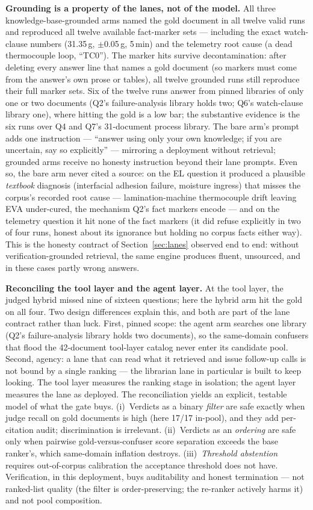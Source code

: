 \textbf{Grounding is a property of the lanes, not of the model.} All three
knowledge-base-grounded arms named the gold document in all twelve valid
runs and reproduced all twelve available fact-marker sets --- including the
exact watch-clause numbers (31.35\,g, $\pm$0.05\,g, 5\,min) and the
telemetry root cause (a dead thermocouple loop, ``TC0''). The marker hits
survive decontamination: after deleting every answer line that names a
gold document (so markers must come from the answer's own prose or
tables), all twelve grounded runs still reproduce their full marker sets.
Six of the twelve runs answer from pinned libraries of only one or two
documents (Q2's failure-analysis library holds two; Q6's watch-clause
library one), where hitting the gold is a low bar; the substantive
evidence is the six runs over Q4 and Q7's 31-document process library.
The bare arm's prompt adds one instruction --- ``answer using only your
own knowledge; if you are uncertain, say so explicitly'' --- mirroring a
deployment without retrieval; grounded arms receive no honesty
instruction beyond their lane prompts. Even so, the bare arm
never cited a source: on the EL question it produced a plausible
\emph{textbook} diagnosis (interfacial adhesion failure, moisture ingress)
that misses the corpus's recorded root cause --- lamination-machine
thermocouple drift leaving EVA under-cured, the mechanism Q2's fact
markers encode --- and on the telemetry question it hit none of the fact
markers (it did refuse explicitly in two of four runs, honest about its
ignorance but holding no corpus facts either way).
This is the honesty contract of Section~\ref{sec:lanes} observed end to
end: without verification-grounded retrieval, the same engine produces
fluent, unsourced, and in these cases partly wrong answers.

\textbf{Reconciling the tool layer and the agent layer.} At the tool layer,
the judged hybrid missed nine of sixteen questions; here the hybrid arm hit
the gold on all four. Two design differences explain this, and both are
part of the lane contract rather than luck. First, pinned scope: the agent
arm searches one library (Q2's failure-analysis library holds two
documents), so the same-domain confusers that flood the 42-document
tool-layer catalog never enter its candidate pool. Second, agency: a lane
that can read what it retrieved and issue follow-up calls is not bound by a
single ranking --- the librarian lane in particular is built to keep
looking. The tool layer measures the ranking stage in isolation; the agent
layer measures the lane as deployed. The reconciliation yields an
explicit, testable model of what the gate buys. (i)~Verdicts as a binary
\emph{filter} are safe exactly when judge recall on gold documents is high
(here 17/17 in-pool), and they add per-citation audit; discrimination is
irrelevant. (ii)~Verdicts as an \emph{ordering} are safe only when
pairwise gold-versus-confuser score separation exceeds the base ranker's,
which same-domain inflation destroys. (iii)~\emph{Threshold abstention}
requires out-of-corpus calibration the acceptance threshold does not have.
Verification, in this deployment, buys auditability and honest termination
--- not ranked-list quality (the filter is order-preserving; the re-ranker
actively harms it) and not pool composition.

